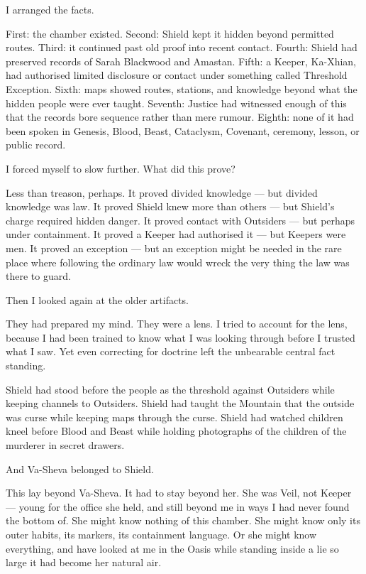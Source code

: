 I arranged the facts.\par

First: the chamber existed. Second: Shield kept it hidden beyond permitted routes. Third: it continued past old proof into recent contact. Fourth: Shield had preserved records of Sarah Blackwood and Amastan. Fifth: a Keeper, Ka-Xhian, had authorised limited disclosure or contact under something called Threshold Exception. Sixth: maps showed routes, stations, and knowledge beyond what the hidden people were ever taught. Seventh: Justice had witnessed enough of this that the records bore sequence rather than mere rumour. Eighth: none of it had been spoken in Genesis, Blood, Beast, Cataclysm, Covenant, ceremony, lesson, or public record.\par

I forced myself to slow further. What did this prove?\par

Less than treason, perhaps. It proved divided knowledge --- but divided knowledge was law. It proved Shield knew more than others --- but Shield's charge required hidden danger. It proved contact with Outsiders --- but perhaps under containment. It proved a Keeper had authorised it --- but Keepers were men. It proved an exception --- but an exception might be needed in the rare place where following the ordinary law would wreck the very thing the law was there to guard.\par

Then I looked again at the older artifacts.\par

They had prepared my mind. They were a lens. I tried to account for the lens, because I had been trained to know what I was looking through before I trusted what I saw. Yet even correcting for doctrine left the unbearable central fact standing.\par

Shield had stood before the people as the threshold against Outsiders while keeping channels to Outsiders. Shield had taught the Mountain that the outside was curse while keeping maps through the curse. Shield had watched children kneel before Blood and Beast while holding photographs of the children of the murderer in secret drawers.\par

And Va-Sheva belonged to Shield.\par

This lay beyond Va-Sheva. It had to stay beyond her. She was Veil, not Keeper --- young for the office she held, and still beyond me in ways I had never found the bottom of. She might know nothing of this chamber. She might know only its outer habits, its markers, its containment language. Or she might know everything, and have looked at me in the Oasis while standing inside a lie so large it had become her natural air.\par

